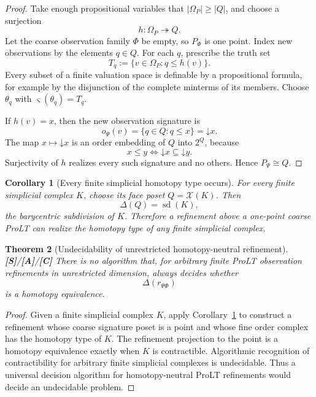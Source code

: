 \documentclass[11pt]{article}
\newtheorem{theorem}{Theorem}[section]
\newtheorem{corollary}[theorem]{Corollary}
\theoremstyle{definition}
\newcommand{\Om}{\Omega_P}
\newcommand{\truth}{\varsigma}
\newcommand{\statusS}{\textbf{[S]}}
\newcommand{\statusA}{\textbf{[A]}}
\newcommand{\statusC}{\textbf{[C]}}
\newcommand{\down}{\mathord\downarrow}
\begin{document}
\begin{proof}
Take enough propositional variables that \(|\Om|\ge|Q|\), and choose a surjection
\[
h:\Om\twoheadrightarrow Q.
\]
Let the coarse observation family \(\Phi\) be empty, so \(P_\Phi\) is one point. Index new observations by the elements \(q\in Q\). For each \(q\), prescribe the truth set
\[
T_q:=\{v\in\Om:q\le h(v)\}.
\]
Every subset of a finite valuation space is definable by a propositional formula, for example by the disjunction of the complete minterms of its members. Choose \(\theta_q\) with \(\truth(\theta_q)=T_q\).

If \(h(v)=x\), then the new observation signature is
\[
o_\Psi(v)=\{q\in Q:q\le x\}=\down x.
\]
The map \(x\mapsto\down x\) is an order embedding of \(Q\) into \(2^Q\), because
\[
x\le y\iff\down x\subseteq\down y.
\]
Surjectivity of \(h\) realizes every such signature and no others. Hence \(P_\Psi\cong Q\).
\end{proof}

\begin{corollary}[Every finite simplicial homotopy type occurs]\label{cor:alltypes}
For every finite simplicial complex \(K\), choose its face poset \(Q=\mathcal X(K)\). Then
\[
\Delta(Q)=\operatorname{sd}(K),
\]
the barycentric subdivision of \(K\). Therefore a refinement above a one-point coarse ProLT can realize the homotopy type of any finite simplicial complex.
\end{corollary}

\begin{theorem}[Undecidability of unrestricted homotopy-neutral refinement]\label{thm:undecidable}
\statusS/\statusA/\statusC\;
There is no algorithm that, for arbitrary finite ProLT observation refinements in unrestricted dimension, always decides whether
\[
\Delta(r_{\Psi\Phi})
\]
is a homotopy equivalence.
\end{theorem}

\begin{proof}
Given a finite simplicial complex \(K\), apply Corollary~\ref{cor:alltypes} to construct a refinement whose coarse signature poset is a point and whose fine order complex has the homotopy type of \(K\). The refinement projection to the point is a homotopy equivalence exactly when \(K\) is contractible. Algorithmic recognition of contractibility for arbitrary finite simplicial complexes is undecidable. Thus a universal decision algorithm for homotopy-neutral ProLT refinements would decide an undecidable problem.
\end{proof}
\end{document}
